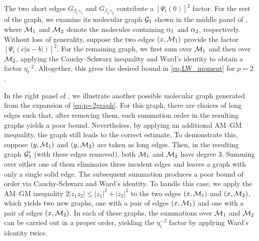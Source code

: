 \begin{example}
The two short edges $G_{\beta_1\gamma_1}$ and $G_{\beta_2\gamma_2}$ contribute a $[\Psi_t(0)]^2$ factor. For the rest of the graph, we examine its molecular graph $\cal G_1$ shown in the middle panel of , where $\cal M_1$ and $\cal M_2$ denote the molecules containing $\al_1$ and $\al_2$, respectively. %
Without loss of generality, suppose the two edges $(x,\cal M_1)$ provide the factor $[\Psi_t(c|a-b|)]^2$. For the remaining graph, we first sum over $\cal M_1$ and then over $\cal M_2$, applying the Cauchy--Schwarz inequality and Ward's identity to obtain a factor $\eta_t^{-2}$. Altogether, this gives the desired bound in \eqref{eq:LW_moment} for $p=2$. 


In the right panel of , we illustrate another possible molecular graph generated from the expansion of \eqref{eq:p=2graph}. For this graph, there are choices of long edges such that, after removing them, each summation order in the resulting graphs yields a poor bound. Nevertheless, by applying an additional AM--GM inequality, the graph still leads to the correct estimate. 
To demonstrate this, suppose $(y,\cal M_1)$ and $(y,\cal M_2)$ are taken as long edges. Then, in the resulting graph $\cal G_2'$ (with these edges removed), both $\cal M_1$ and $\cal M_2$ have degree $3$. 
Summing over either one of them eliminates three incident edges and leaves a graph with only a single solid edge. The subsequent summation produces a poor bound of order  via Cauchy-Schwarz and Ward's identity. 
To handle this case, we apply the AM--GM inequality $2|z_1z_2|\le |z_1|^2+|z_2|^2$ to the two edges $(x,\cal M_1)$ and $(x, \cal M_2)$, which yields two new graphs, one with a pair of edges $(x,\cal M_1)$ and one with a pair of edges $(x, \cal M_2)$. 
In each of these graphs, the summations over $\cal M_1$ and $\cal M_2$ can be carried out in a proper order, yielding the $\eta_t^{-2}$ factor by applying Ward's identity twice. 



\end{example}
